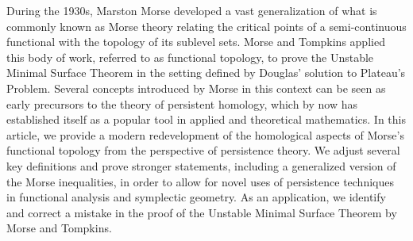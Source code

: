 During the 1930s, Marston Morse developed a vast generalization of what is commonly known as Morse theory relating the critical points of a semi-continuous functional with the topology of its sublevel sets.
Morse and Tompkins applied this body of work, referred to as functional topology, to prove the Unstable Minimal Surface Theorem in the setting defined by Douglas' solution to Plateau's Problem.
Several concepts introduced by Morse in this context can be seen as early precursors to the theory of persistent homology, which by now has established itself as a popular tool in applied and theoretical mathematics.
In this article, we provide a modern redevelopment of the homological aspects of Morse's functional topology from the perspective of persistence theory.
We adjust several key definitions and prove stronger statements, including a generalized version of the Morse inequalities, in order to allow for novel uses of persistence techniques in functional analysis and symplectic geometry.
As an application, we identify and correct a mistake in the proof of the Unstable Minimal Surface Theorem by Morse and Tompkins.